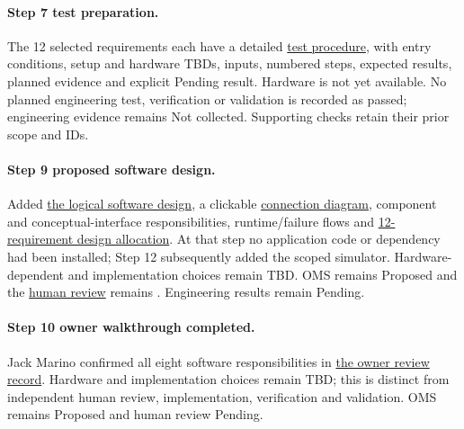 \paragraph{Step 7 test preparation.} The 12 selected requirements each have a detailed \hyperref[Table:WeekTwoTests]{test procedure}, with entry conditions, setup and hardware TBDs, inputs, numbered steps, expected results, planned evidence and explicit Pending result. Hardware is not yet available. No planned engineering test, verification or validation is recorded as passed; engineering evidence remains Not collected. Supporting checks retain their prior scope and IDs.

\paragraph{Step 9 proposed software design.} Added \hyperref[Section:MainSoftwareDesign]{the logical software design}, a clickable \hyperref[Figure:SoftwareComponents]{connection diagram}, component and conceptual-interface responsibilities, runtime/failure flows and \hyperref[Table:SoftwareAllocation]{12-requirement design allocation}. At that step no application code or dependency had been installed; Step 12 subsequently added the scoped simulator. Hardware-dependent and implementation choices remain TBD. OMS remains Proposed and the \hyperref[Section:HumanReviewChecklist]{human review} remains \StatusPending. Engineering results remain Pending.

\paragraph{Step 10 owner walkthrough completed.}
Jack Marino confirmed all eight software responsibilities in
\hyperref[Table:OwnerSoftwareReview]{the owner review record}. Hardware and
implementation choices remain TBD; this is distinct from independent human
review, implementation, verification and validation. OMS remains Proposed and
human review Pending.

